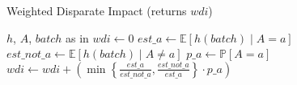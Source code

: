 \begin{algorithm}
    \caption{Weighted Disparate Impact (returns $wdi$)}
    \label{alg:wdi}
    \begin{algorithmic}[1]
        \Require $h$, $A$, $batch$ \hfill as in 
        \State $wdi \leftarrow 0$
            \State $est\_a \leftarrow \mathbb{E}[h(batch) \mid A = a]$
            \State $est\_not\_a \leftarrow \mathbb{E}[h(batch) \mid A \neq a]$
            \State $p\_a \leftarrow \mathbb{P}[A = a]$
            \State $wdi \leftarrow wdi + \left( \min\left\{ \frac{est\_a}{est\_not\_a}, \frac{est\_not\_a}{est\_a} \right\} \cdot p\_a \right)$
        \EndFor
    \end{algorithmic}
\end{algorithm}